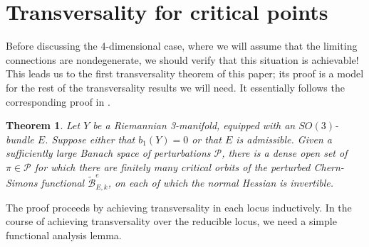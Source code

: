 \documentclass{memo-l}
\newtheorem{theorem}{Theorem}[chapter]
\theoremstyle{definition}
\theoremstyle{remark}
\numberwithin{section}{chapter}
\numberwithin{equation}{chapter}
\begin{document}
\section{Transversality for critical points}\label{sec:3d-trans}
Before discussing the 4-dimensional case, where we will assume that the limiting connections are nondegenerate, we should verify that this situation is achievable! This leads us to the first transversality theorem of this paper; its proof is a model for the rest of the transversality results we will need. It essentially follows the corresponding proof in \cite{AB}.

\begin{theorem}\label{trans1}Let $Y$ be a Riemannian 3-manifold, equipped with an $SO(3)$-bundle $E$. Suppose either that $b_1(Y) = 0$ or that $E$ is admissible. Given a sufficiently large Banach space of perturbations $\mathcal P$, there is a dense open set of $\pi \in \mathcal P$ for which there are finitely many critical orbits of the perturbed Chern-Simons functional $\widetilde{\mathcal B}^{e}_{E,k}$, on each of which the normal Hessian is invertible.
\end{theorem}

The proof proceeds by achieving transversality in each locus inductively. In the course of achieving transversality over the reducible locus, we need a simple functional analysis lemma.
\end{document}
